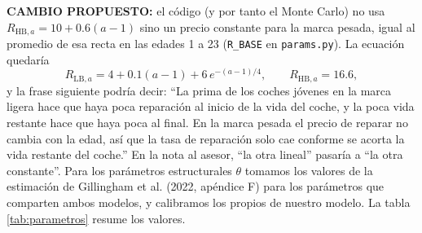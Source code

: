 \documentclass{article}
\begin{document}
{\color{red}\textbf{CAMBIO PROPUESTO:} el código (y por tanto el Monte Carlo) no usa $R_{\text{HB},a}=10+0.6(a-1)$ sino un precio constante para la marca pesada, igual al promedio de esa recta en las edades 1 a 23 (\texttt{R\_BASE} en \texttt{params.py}). La ecuación quedaría
$$R_{\text{LB},a}=4+0.1(a-1)+6\,e^{-(a-1)/4},\qquad R_{\text{HB},a}=16.6,$$
y la frase siguiente podría decir: ``La prima de los coches jóvenes en la marca ligera hace que haya poca reparación al inicio de la vida del coche, y la poca vida restante hace que haya poca al final. En la marca pesada el precio de reparar no cambia con la edad, así que la tasa de reparación solo cae conforme se acorta la vida restante del coche.'' En la nota al asesor, ``la otra lineal'' pasaría a ``la otra constante''.}
Para los parámetros estructurales $\theta$ tomamos los valores de la estimación de Gillingham et al. (2022, apéndice F) para los parámetros que comparten ambos modelos, y calibramos los propios de nuestro modelo. La tabla \ref{tab:parametros} resume los valores.
\pagebreak
\end{document}
